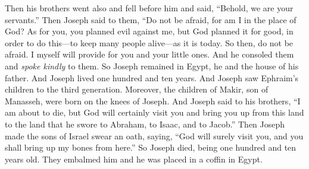 \begin{biblechapter}
\verse Then his brothers went also and fell before him and said, “Behold, we are your servants.”
\verse Then Joseph said to them, “Do not be afraid, for am I in the place of God?
\verse As for you, you planned evil against me, but God planned it for good, in order to do this—to keep many people alive—as it is today.
\verse So then, do not be afraid. I myself will provide for you and your little ones. And he consoled them and \textit{spoke kindly} to them.
 So Joseph remained in Egypt, he and the house of his father. And Joseph lived one hundred and ten years.
\verse And Joseph saw Ephraim’s children to the third generation. Moreover, the children of Makir, son of Manasseh, were born on the knees of Joseph.
\verse And Joseph said to his brothers, “I am about to die, but God will certainly visit you and bring you up from this land to the land that he swore to Abraham, to Isaac, and to Jacob.”
\verse Then Joseph made the sons of Israel swear an oath, saying, “God will surely visit you, and you shall bring up my bones from here.”
\verse So Joseph died, being one hundred and ten years old. They embalmed him and he was placed in a coffin in Egypt.
\end{biblechapter}

